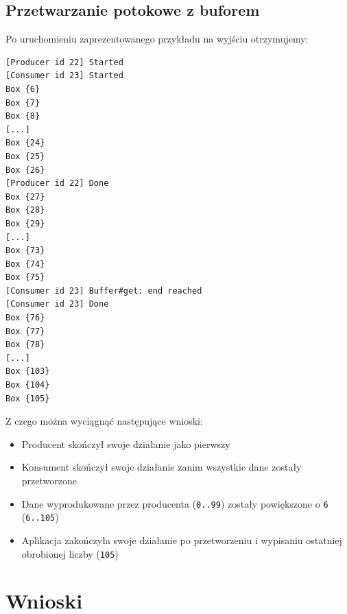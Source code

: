 \documentclass[11pt]{article}
\providecommand{\tightlist}{%
      \setlength{\itemsep}{0pt}\setlength{\parskip}{0pt}}
\begin{document}
    \hypertarget{przetwarzanie-potokowe-z-buforem}{%
\subsection{Przetwarzanie potokowe z
buforem}\label{przetwarzanie-potokowe-z-buforem}}

Po uruchomieniu zaprezentowanego przykładu na wyjściu otrzymujemy:

\begin{verbatim}
[Producer id 22] Started
[Consumer id 23] Started
Box {6}
Box {7}
Box {8}
[...]
Box {24}
Box {25}
Box {26}
[Producer id 22] Done
Box {27}
Box {28}
Box {29}
[...]
Box {73}
Box {74}
Box {75}
[Consumer id 23] Buffer#get: end reached
[Consumer id 23] Done
Box {76}
Box {77}
Box {78}
[...]
Box {103}
Box {104}
Box {105}
\end{verbatim}

Z czego można wyciągnąć następujące wnioski:

\begin{itemize}
\tightlist
\item
  Producent skończył swoje działanie jako pierwszy
\item
  Konsument skończył swoje działanie zanim wszystkie dane zostały
  przetworzone
\item
  Dane wyprodukowane przez producenta (\texttt{0..99}) zostały
  powiększone o \texttt{6} (\texttt{6..105})
\item
  Aplikacja zakończyła swoje działanie po przetworzeniu i wypisaniu
  ostatniej obrobionej liczby (\texttt{105})
\end{itemize}

    \hypertarget{wnioski}{%
\section{Wnioski}\label{wnioski}}
\end{document}
